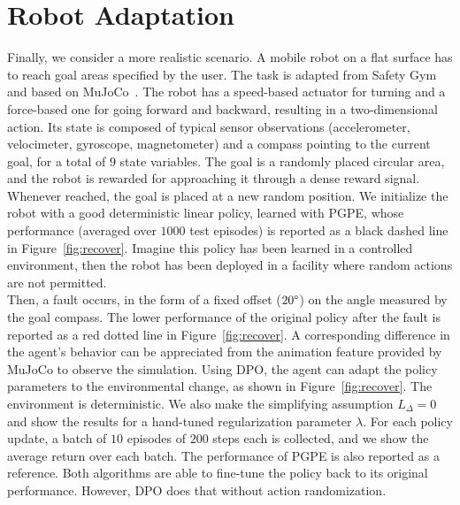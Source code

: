 \section{Robot Adaptation} \label{sec:safe}
Finally, we consider a more realistic scenario. A mobile robot on a flat surface has to reach goal areas specified by the user. 
The task is adapted from Safety Gym~\citep{ray2019benchmarking} and based on MuJoCo~\citep{todorov2012mujoco}. The robot has a speed-based actuator for turning and a force-based one for going forward and backward, resulting in a two-dimensional action. Its state is composed of typical sensor observations (accelerometer, velocimeter, gyroscope, magnetometer) and a compass pointing to the current goal, for a total of $9$ state variables. The goal is a randomly placed circular area, and the robot is rewarded for approaching it through a dense reward signal. Whenever reached, the goal is placed at a new random position. We initialize the robot with a good deterministic linear policy, learned with \ac{PGPE}, whose performance (averaged over $1000$ test episodes) is reported as a black dashed line in Figure~\ref{fig:recover}. Imagine this policy has been learned in a controlled environment, then the robot has been deployed in a facility where random actions are not permitted.\\
\newline
Then, a fault occurs, in the form of a fixed offset ($20\degree$) on the angle measured by the goal compass. The lower performance of the original policy after the fault is reported as a red dotted line in Figure~\ref{fig:recover}. A corresponding difference in the agent's behavior can be appreciated from the animation feature provided by MuJoCo to observe the simulation. Using \ac{DPO}, the agent can adapt the policy parameters to the environmental change, as shown in Figure~\ref{fig:recover}. The environment is deterministic. We also make the simplifying assumption $L_{\Delta}=0$ and show the results for a hand-tuned regularization parameter $\lambda$. For each policy update, a batch of $10$ episodes of $200$ steps each is collected, and we show the average return over each batch. The performance of \ac{PGPE} is also reported as a reference. Both algorithms are able to fine-tune the policy back to its original performance. However, \ac{DPO} does that without action randomization.

